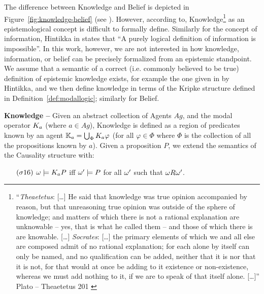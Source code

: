 The difference between Knowledge and Belief is depicted in
Figure~\ref{fig:knowledge-belief} (see \autocite{wiki-knowledgebelief}).  However,
according to\autocite{Gettier2012knowledge},
Knowledge\footnote{``\emph{Theaetetus}: [\ldots] He said that knowledge was
true opinion accompanied by reason, but that unreasoning true opinion was
outside of the sphere of knowledge; and matters of which there is not a
rational explanation are unknowable -- yes, that is what he called them -- and
those of which there is are knowable. [\ldots] \emph{Socrates}: [\ldots] the
primary elements of which we and all else are composed admit of no rational
explanation; for each alone by itself can only be named, and no qualification
can be added, neither that it is nor that it is not, for that would at once be
adding to it existence or non-existence, whereas we must add nothing to it, if
we are to speak of that itself alone.  [\ldots]'' Plato -- Theaetetus 201
\autocite{Plato1914Plato}} as an epistemological concept is difficult to formally define. 
Similarly for the concept of information, Hintikka in \autocite{Hintikka1993Information}
states that ``A purely logical definition of information is impossible''.
In this work, however, we are not interested in how knowledge, information, or
belief can be precisely formalized from an epistemic standpoint.  We assume
that a semantic of a correct (i.e. commonly believed to be true) definition of epistemic knowledge exists, for
example the one given in\autocite{Hintikka1962knowledge} by Hintikka, and we
then define knowledge in terms of the Kripke structure defined in
Definition~\ref{def:modallogic}; similarly for Belief.

\begin{definition}{\bf Knowledge --}\label{def:knowledge}
Given an abstract collection of Agents $Ag$, and the modal operator
	$K_{a}$ (where $a\in Ag$), Knowledge is defined as a region 
	of predicates known by an agent $\mathbb{K}_{a}=\bigcup_\Phi K_{a}\varphi$ 
	(for all $\varphi\in\Phi$ where $\Phi$ is the collection of all the propositions known by $a$).
	Given a proposition $P$, we extend the semantics of the Causality structure with:
	\begin{enumerate}[noitemsep]
		\item[$(\sigma16)$] $\omega\models K_{a}P$ iff
			$\omega'\models P$ for all $\omega'$ such that
			$\omega R\omega'$.
	\end{enumerate}
\end{definition}

